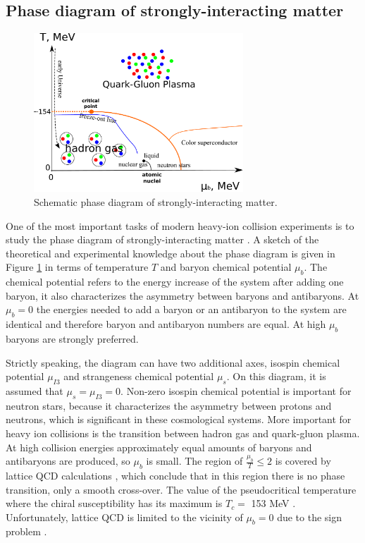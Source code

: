 \subsection{Phase diagram of strongly-interacting matter}

\begin{figure}
  \centering
  \includegraphics[width = 0.7\textwidth]{illustrations/intro_illustrations/phase_diagram.pdf}
  \caption{Schematic phase diagram of strongly-interacting matter.}
  \label{fig:phase_diagram}
\end{figure}

One of the most important tasks of modern heavy-ion collision experiments is
to study the phase diagram of strongly-interacting matter
\cite{BraunMunzinger:2008tz}. A sketch of the theoretical and experimental
knowledge about the phase diagram is given in Figure \ref{fig:phase_diagram} in
terms of temperature $T$ and baryon chemical potential $\mu_b$. The chemical potential
refers to the energy increase of the system after adding one baryon, it also
characterizes the asymmetry between baryons and antibaryons. At $\mu_b = 0$ the
energies needed to add a baryon or an antibaryon to the system are identical and
therefore baryon and antibaryon numbers are equal. At high $\mu_b$ baryons are
strongly preferred.

Strictly speaking, the diagram can have two additional axes, isospin chemical
potential $\mu_{I3}$ and strangeness chemical potential $\mu_s$. On this
diagram, it is assumed that $\mu_s=\mu_{I3} = 0$.  Non-zero isospin chemical
potential is important for neutron stars, because it characterizes the asymmetry
between protons and neutrons, which is significant in these cosmological systems.
More important for heavy ion collisions is the transition between hadron gas
and quark-gluon plasma. At high collision energies approximately equal amounts
of baryons and antibaryons are produced, so $\mu_b$ is small. The region of
$\frac{\mu_b}{T} \le 2$ is covered by lattice QCD calculations
\cite{Borsanyi:2013bia,Bazavov:2014pvz,Bazavov:2017dus}, which conclude that in
this region there is no phase transition, only a smooth cross-over.  The value
of the pseudocritical temperature where the chiral susceptibility has its maximum
is $T_c = $ 153 MeV \cite{Aoki:2006br,Borsanyi:2010bp,Bazavov:2011nk}.
Unfortunately, lattice QCD is limited to the vicinity of $\mu_b = 0$ due to
the sign problem \cite{deForcrand:2010ys}.


